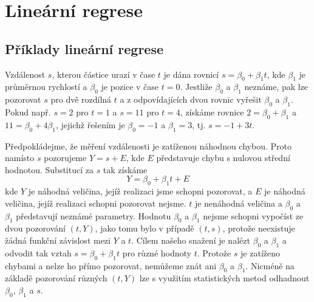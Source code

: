 \chapter{Lineární regrese}

\section{Příklady lineární regrese}

\begin{example}
Vzdálenost $s$, kterou částice urazí v čase $t$ je dána rovnicí $s = \beta_0 + \beta_1t$, kde $\beta_1$ je průměrnou rychlostí a $\beta_0$ je pozice v čase $t = 0$. Jestliže $\beta_0$ a $\beta_1$ neznáme, pak lze pozorovat $s$ pro dvě rozdílná $t$ a z odpovídajících dvou rovnic vyřešit $\beta_0$ a $\beta_1$. Pokud např. $s = 2$ pro $t = 1$ a $s = 11$ pro $t = 4$, získáme rovnice $2 = \beta_0 + \beta_1$ a $11 = \beta_0 + 4 \beta_1$, jejichž řešením je $\beta_0 = -1$ a $\beta_1 = 3$, tj. $s = -1 + 3t$.

Předpokládejme, že měření vzdálenosti je zatíženou náhodnou chybou. Proto namísto $s$ pozorujeme $Y = s + E$, kde $E$ představuje chybu s nulovou střední hodnotou. Substitucí za $s$ tak získáme
\begin{equation*}
Y = \beta_0 + \beta_1t + E
\end{equation*}
kde $Y$ je náhodná veličina, jejíž realizaci jsme schopni pozorovat, a $E$ je náhodná veličina, jejíž realizaci schopni pozorovat nejsme. $t$ je nenáhodná veličina a $\beta_0$ a $\beta_1$ představují neznámé parametry. Hodnotu $\beta_0$ a $\beta_1$ nejsme schopni vypočíst ze dvou pozorování $(t,Y)$, jako tomu bylo v případě $(t, s)$, protože neexistuje žádná funkční závislost mezi $Y$ a $t$. Cílem našeho snažení je nalézt $\beta_0$ a $\beta_1$ a odvodit tak vztah $s = \beta_0 + \beta_1t$ pro různé hodnoty $t$. Protože $s$ je zatíženo chybami a nelze ho přímo pozorovat, nemůžeme znát ani $\beta_0$ a $\beta_1$. Nicméně na základě pozorování různých $(t,Y)$ lze s využitím statistických metod odhadnout $\beta_0$, $\beta_1$ a $s$.
\end{example}


